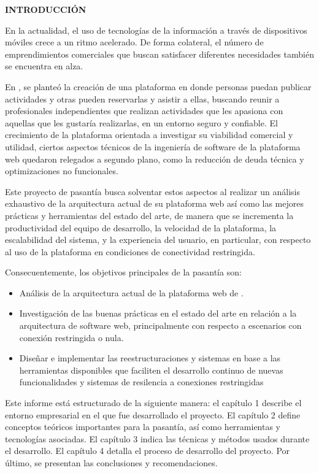 \begin{center}
\textsc{\bfseries\uppercase{Introducción}}
\end{center}

En la actualidad, el uso de tecnologías de la información a través de dispositivos móviles crece a un ritmo acelerado. De forma colateral, el número de emprendimientos comerciales que buscan satisfacer diferentes necesidades también se encuentra en alza.

En \business, se planteó la creación de una plataforma en donde personas puedan publicar actividades y otras pueden reservarlas y asistir a ellas, buscando reunir a profesionales independientes que realizan actividades que les apasiona con aquellas que les gustaría realizarlas, en un entorno seguro y confiable. El crecimiento de la plataforma orientada a investigar su viabilidad comercial y utilidad, ciertos aspectos técnicos de la ingeniería de software de la plataforma web quedaron relegados a segundo plano, como la reducción de deuda técnica y optimizaciones no funcionales.

Este proyecto de pasantía busca solventar estos aspectos al realizar un análisis exhaustivo de la arquitectura actual de su plataforma web así como las mejores prácticas y herramientas del estado del arte, de manera que se incrementa la productividad del equipo de desarrollo, la velocidad de la plataforma, la escalabilidad del sistema, y la experiencia del usuario, en particular, con respecto al uso de la plataforma en condiciones de conectividad restringida.

Consecuentemente, los objetivos principales de la pasantía son:

\begin{itemize}
  \item Análisis de la arquitectura actual de la plataforma web de \business.
  \item Investigación de las buenas prácticas en el estado del arte en relación a la arquitectura de software web, principalmente con respecto a escenarios con conexión restringida o nula.
  \item Diseñar e implementar las reestructuraciones y sistemas en base a las herramientas disponibles que faciliten el desarrollo continuo de nuevas funcionalidades y sistemas de resilencia a conexiones restringidas
\end{itemize}

Este informe está estructurado de la siguiente manera: el capítulo 1 describe el entorno empresarial en el que fue desarrollado el proyecto. El capítulo 2 define conceptos teóricos importantes para la pasantía, así como herramientas y tecnologías asociadas. El capítulo 3 indica las técnicas y métodos usados durante el desarrollo. El capítulo 4 detalla el proceso de desarrollo del proyecto. Por último, se presentan las conclusiones y recomendaciones.
